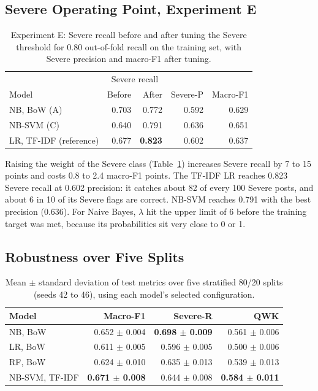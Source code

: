 \documentclass[conference]{IEEEtran}
\begin{document}
\subsection{Severe Operating Point, Experiment E}

\begin{table}[!htbp]
\centering
\caption{Experiment E: Severe recall before and after tuning the Severe threshold for 0.80 out-of-fold recall on the training set, with Severe precision and macro-F1 after tuning.}
\label{tab:thr}
\begin{tabular}{lrrrr}
\toprule
 & \multicolumn{2}{c}{Severe recall} & & \\
Model & Before & After & Severe-P & Macro-F1 \\
\midrule
NB, BoW (A) & 0.703 & 0.772 & 0.592 & 0.629 \\
NB-SVM (C) & 0.640 & 0.791 & 0.636 & 0.651 \\
LR, TF-IDF (reference) & 0.677 & \textbf{0.823} & 0.602 & 0.637 \\
\bottomrule
\end{tabular}
\end{table}

Raising the weight of the Severe class (Table~\ref{tab:thr}) increases Severe recall by 7 to 15 points and costs 0.8 to 2.4 macro-F1 points. The TF-IDF LR reaches 0.823 Severe recall at 0.602 precision: it catches about 82 of every 100 Severe posts, and about 6 in 10 of its Severe flags are correct. NB-SVM reaches 0.791 with the best precision (0.636). For Naive Bayes, $\lambda$ hit the upper limit of 6 before the training target was met, because its probabilities sit very close to 0 or 1.

\subsection{Robustness over Five Splits}

\begin{table}[!htbp]
\centering
\caption{Mean $\pm$ standard deviation of test metrics over five stratified 80/20 splits (seeds 42 to 46), using each model's selected configuration.}
\label{tab:seeds}
\begin{tabular}{lrrr}
\toprule
Model & Macro-F1 & Severe-R & QWK \\
\midrule
NB, BoW & 0.652 $\pm$ 0.004 & \textbf{0.698 $\pm$ 0.009} & 0.561 $\pm$ 0.006 \\
LR, BoW & 0.611 $\pm$ 0.005 & 0.596 $\pm$ 0.005 & 0.500 $\pm$ 0.006 \\
RF, BoW & 0.624 $\pm$ 0.010 & 0.635 $\pm$ 0.013 & 0.539 $\pm$ 0.013 \\
NB-SVM, TF-IDF & \textbf{0.671 $\pm$ 0.008} & 0.644 $\pm$ 0.008 & \textbf{0.584 $\pm$ 0.011} \\
\bottomrule
\end{tabular}
\end{table}
\end{document}
